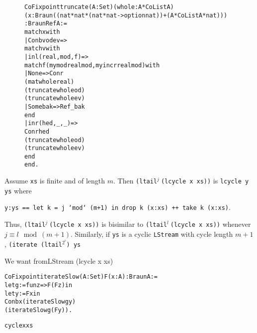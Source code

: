 \documentclass{llncs}
\begin{document}
\begin{figure}
\begin{alltt}
CoFixpoint truncate (A:Set) (whole:A * CoList A)
  (x:Braun ((nat*nat*(nat*nat->option nat))+(A * CoList A * nat)))
    : BraunRef A :=
    match x with
      | Conb v od ev =>
        match v with 
          | inl (real,mod,f) =>
            match f (mymod real mod,myincr real mod) with
              | None => Conr 
                        (mat whole real)
                        (truncate whole od)
                        (truncate whole ev)
              | Some bak => Ref _ bak
            end
          |inr (hed, _, _) =>
            Conr hed
            (truncate whole od)
            (truncate whole ev)
        end
    end.

\end{alltt}
\caption{}
\label{braunRef}
\end{figure}


Assume {\tt xs} is finite and of length $m$.
Then {\tt (ltail}$^j\ ${\tt (lcycle x xs))} is {\tt lcycle y ys} where 

{\tt y:ys == let k = j `mod` (m+1) in drop k (x:xs) ++ take k (x:xs)}.

Thus, {\tt (ltail}$^j\ ${\tt (lcycle x xs))} is bisimilar to {\tt (ltail}$^l\ ${\tt (lcycle x xs))} whenever $j \equiv l \mod (m+1)$.
Similarly, if {\tt ys} is a cyclic {\tt LStream} with cycle length $m+1$, {\tt (iterate (ltail}$^{2^i}${\tt ) ys}


We want fromLStream (lcycle x xs)



\begin{alltt}
CoFixpoint iterateSlow (A:Set) F (x:A) : Braun A :=
  let g := fun z => F (F z) in
    let y := F x in
      Conb x (iterateSlow g y)
             (iterateSlow g (F y)).

cycle x xs 
\end{alltt}
\end{document}

